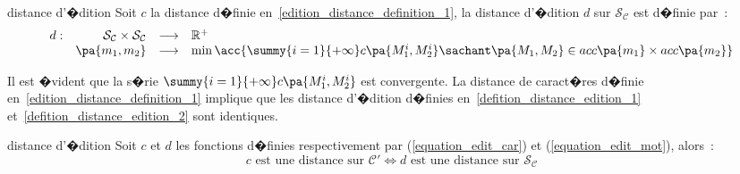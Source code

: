 		\begin{xdefinition}{distance d'�dition}\label{defition_distance_edition_2}%
		Soit $c$ la distance d�finie en~\ref{edition_distance_definition_1}, la distance d'�dition $d$ sur
		$\mathcal{S}_\mathcal{C}$ est d�finie par~:
		    \begin{eqnarray}
		    \begin{array}{crcl}
		    d : & \mathcal{S}_\mathcal{C} \times \mathcal{S}_\mathcal{C} & \longrightarrow & \mathbb{R}^+\\
		        & \pa{m_1,m_2} & \longrightarrow &
		                        \min \acc{  \summy{i=1}{+\infty} c\pa{M_1^i, M_2^i} \sachant
		                                    \pa{M_1,M_2} \in acc\pa{m_1} \times acc\pa{m_2}}
		    \end{array}
		    \label{equation_edit_mot}
		    \end{eqnarray}
		\end{xdefinition}


Il est �vident que la s�rie $\summy{i=1}{+\infty} c\pa{M_1^i, M_2^i}$ est convergente. La distance de caract�res d�finie en~\ref{edition_distance_definition_1} implique que les distance d'�dition d�finies en~\ref{defition_distance_edition_1} et~\ref{defition_distance_edition_2} sont identiques.





		\begin{xtheoremmine}{distance d'�dition}
		\label{edition_distance_theoreme001}
		Soit $c$ et $d$ les fonctions d�finies respectivement par (\ref{equation_edit_car}) et (\ref{equation_edit_mot}),
		alors~:
		    $$
		    c \text{ est une distance sur } \mathcal{C}' \Longleftrightarrow d \text { est une distance sur }
		    \mathcal{S}_\mathcal{C}
		    $$
		\end{xtheoremmine}







